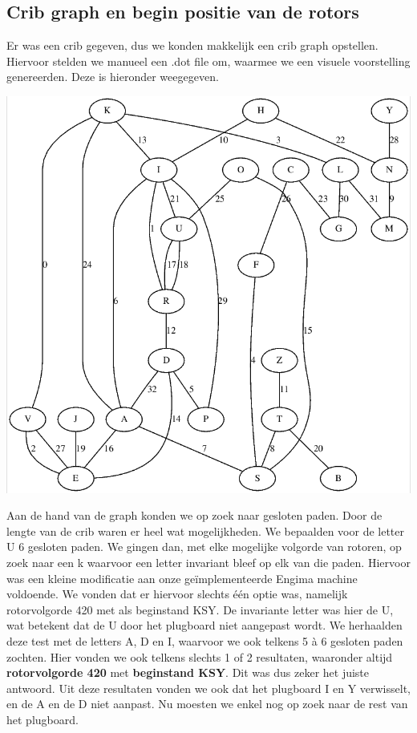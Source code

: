 \subsection{Crib graph en begin positie van de rotors}
Er was een crib gegeven, dus we konden makkelijk een crib graph opstellen. Hiervoor stelden we manueel een .dot file om, waarmee we een visuele voorstelling genereerden. Deze is hieronder weegegeven. \\
\begin{center}
\includegraphics[scale=0.25]{enigma/graph.png}
\end{center}  
Aan de hand van de graph konden we op zoek naar gesloten paden. Door de lengte van de crib waren er heel wat mogelijkheden. We bepaalden voor de letter U 6 gesloten paden. We gingen dan, met elke mogelijke volgorde van rotoren, op zoek naar een k waarvoor een letter invariant bleef op elk van die paden. Hiervoor was een kleine modificatie aan onze ge\"implementeerde Engima machine voldoende. We vonden dat er hiervoor slechts \'e\'en optie was, namelijk rotorvolgorde 420 met als beginstand KSY. De invariante letter was hier de U, wat betekent dat de U door het plugboard niet aangepast wordt. We herhaalden deze test met de letters A, D en I, waarvoor we ook telkens 5 \`a 6 gesloten paden zochten. Hier vonden we ook telkens slechts 1 of 2 resultaten, waaronder altijd \textbf{rotorvolgorde 420} met \textbf{beginstand KSY}. Dit was dus zeker het juiste antwoord. Uit deze resultaten vonden we ook dat het plugboard I en Y verwisselt, en de A en de D niet aanpast. Nu moesten we enkel nog op zoek naar de rest van het plugboard. 

